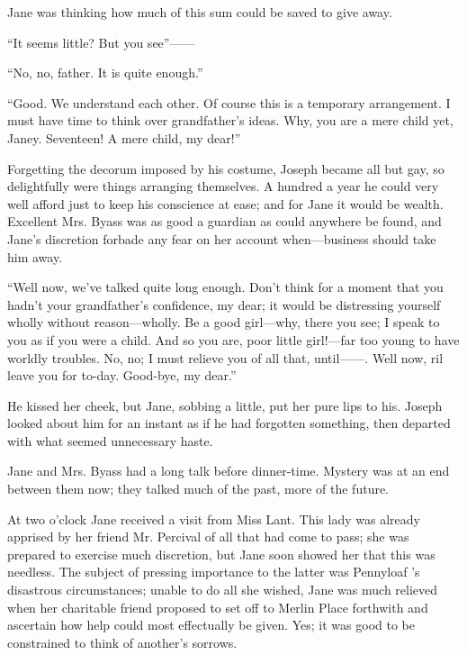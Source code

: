 Jane was thinking how much of this sum could be saved to give away.

``It seems little? But you see''{{------}}

``No, no, father. It is quite enough.''

``Good. We understand each other. Of course this is a temporary
arrangement. I must have time to think over grandfather's ideas. Why,
you are a mere child yet, Janey. Seventeen! A mere child, my dear!''

Forgetting the decorum imposed by his costume, Joseph became all but
gay, so delightfully were things arranging themselves. A hundred a year
he could very well afford just to keep his conscience at ease; and for
Jane {\protect\hypertarget{234}{}{}}it would be wealth. Excellent Mrs.
Byass was as good a guardian as could anywhere be found, and Jane's
discretion forbade any fear on her account when---business should take
him away.

``Well now, we've talked quite long enough. Don't think for a moment
that you hadn't your grandfather's confidence, my dear; it would be
distressing yourself wholly without reason---wholly. Be a good
girl---why, there you see; I speak to you as if you were a child. And so
you are, poor little girl!---far too young to have worldly troubles. No,
no; I must relieve you of all that, until{{------}}. Well now, ril leave
you for to-day. Good-bye, my dear.''

He kissed her cheek, but Jane, sobbing a little, put her pure lips to
his. Joseph looked about him for an instant as if he had forgotten
something, then departed with what seemed unnecessary haste.

Jane and Mrs. Byass had a long talk before dinner-time. Mystery was at
an end between them now; they talked much of the past, more of the
future.

At two o'clock Jane received a visit from Miss Lant. This lady was
already apprised by her friend Mr. Percival of all that had come
{\protect\hypertarget{235}{}{}}to pass; she was prepared to exercise
much discretion, but Jane soon showed her that this was needless. The
subject of pressing importance to the latter was Pennyloaf 's disastrous
circumstances; unable to do all she wished, Jane was much relieved when
her charitable friend proposed to set off to Merlin Place forthwith and
ascertain how help could most effectually be given. Yes; it was good to
be constrained to think of another's sorrows.


